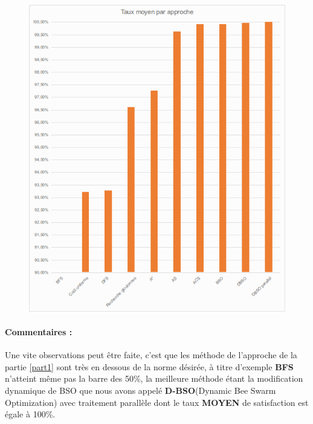 \begin{figure}[H]
	\includegraphics[width=\textwidth]{images/battleRoyale.png}
\end{figure}


\paragraph{Commentaires : }
Une vite observations peut être faite, c'est que les méthode de l'approche de la partie \ref{part1} sont très en dessous de la norme désirée, à titre d'exemple \textbf{BFS} n'atteint même pas la barre des 50\%, la meilleure méthode étant la modification dynamique de BSO que nous avons appelé \textbf{D-BSO}(Dynamic Bee Swarm Optimization) avec traitement parallèle dont le taux \textbf{MOYEN} de satisfaction est égale à 100\%.